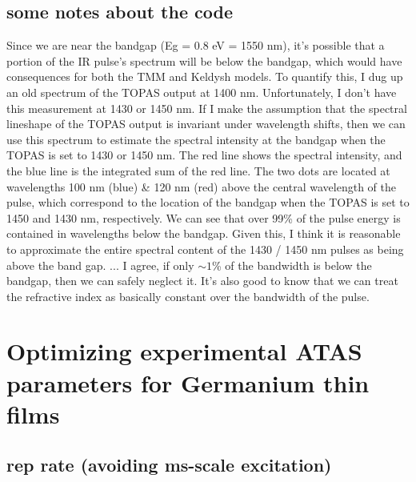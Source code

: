 \subsection{some notes about the code}





Since we are near the bandgap (Eg = 0.8 eV = 1550 nm), it's possible that a portion of the IR pulse's spectrum will be below the bandgap, which would have consequences for both the TMM and Keldysh models. To quantify this, I dug up an old spectrum of the TOPAS output at 1400 nm. Unfortunately, I don't have this measurement at 1430 or 1450 nm. If I make the assumption that the spectral lineshape of the TOPAS output is invariant under wavelength shifts, then we can use this spectrum to estimate the spectral intensity at the bandgap when the TOPAS is set to 1430 or 1450 nm. The red line shows the spectral intensity, and the blue line is the integrated sum of the red line. The two dots are located at wavelengths 100 nm (blue) \& 120 nm (red) above the central wavelength of the pulse, which correspond to the location of the bandgap when the TOPAS is set to 1450 and 1430 nm, respectively. We can see that over 99\% of the pulse energy is contained in wavelengths below the bandgap. Given this, I think it is reasonable to approximate the entire spectral content of the 1430 / 1450 nm pulses as being above the band gap. ... I agree, if only $\sim 1$\% of the bandwidth is below the bandgap, then we can safely neglect it. It's also good to know that we can treat the refractive index as basically constant over the bandwidth of the pulse.


\section{Optimizing experimental ATAS parameters for Germanium thin films}

\subsection{rep rate (avoiding ms-scale excitation)}

